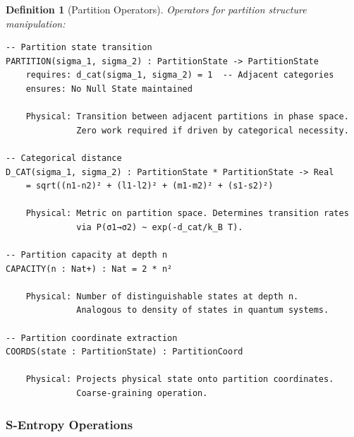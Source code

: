 \documentclass[aps,prd,twocolumn,superscriptaddress,floatfix,nofootinbib]{revtex4-2}
\newtheorem{definition}[theorem]{Definition}
\theoremstyle{remark}
\begin{document}
\begin{definition}[Partition Operators]
\label{def:partition_ops}
Operators for partition structure manipulation:
\begin{verbatim}
-- Partition state transition
PARTITION(sigma_1, sigma_2) : PartitionState -> PartitionState
    requires: d_cat(sigma_1, sigma_2) = 1  -- Adjacent categories
    ensures: No Null State maintained
    
    Physical: Transition between adjacent partitions in phase space.
              Zero work required if driven by categorical necessity.

-- Categorical distance
D_CAT(sigma_1, sigma_2) : PartitionState * PartitionState -> Real
    = sqrt((n1-n2)² + (l1-l2)² + (m1-m2)² + (s1-s2)²)
    
    Physical: Metric on partition space. Determines transition rates
              via P(σ1→σ2) ~ exp(-d_cat/k_B T).

-- Partition capacity at depth n
CAPACITY(n : Nat+) : Nat = 2 * n²
    
    Physical: Number of distinguishable states at depth n.
              Analogous to density of states in quantum systems.

-- Partition coordinate extraction
COORDS(state : PartitionState) : PartitionCoord
    
    Physical: Projects physical state onto partition coordinates.
              Coarse-graining operation.
\end{verbatim}
\end{definition}

\subsubsection{S-Entropy Operations}
\end{document}
